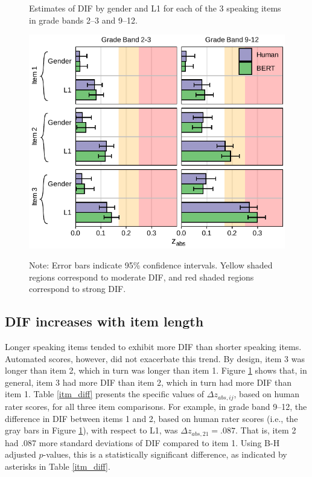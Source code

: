 \documentclass [PhD] {uclathes}
\begin{document}
\begin{figure}[h]
    \centering
    \caption{Estimates of DIF by gender and L1 for each of the 3 speaking items in grade bands 2–3 and 9–12.}    
    \includegraphics[width=5in]{figures/20230504_ETS-DIF_BERT_zabs_itm_edit.pdf}
    \label{fig:zabs_itm}
\caption*{\small Note: Error bars indicate 95\% confidence intervals. Yellow shaded regions correspond to moderate DIF, and red shaded regions correspond to strong DIF.}
\end{figure}

\subsection{DIF increases with item length}

Longer speaking items tended to exhibit more DIF than shorter speaking items. Automated scores, however, did not exacerbate this trend. By design, item 3 was longer than item 2, which in turn was longer than item 1. Figure \ref{fig:zabs_itm} shows that, in general, item 3 had more DIF than item 2, which in turn had more DIF than item 1. Table \ref{itm_diff} presents the specific values of $\Delta z_{abs,ij}$, based on human rater scores, for all three item comparisons. For example, in grade band 9–12, the difference in DIF between items 1 and 2, based on human rater scores (i.e., the gray bars in Figure \ref{fig:zabs_itm}), with respect to L1, was $\Delta z_{abs, 21} = .087$. That is, item 2 had .087 more standard deviations of DIF compared to item 1. Using B-H adjusted $p$-values, this is a statistically significant difference, as indicated by asterisks in Table \ref{itm_diff}. 
\end{document}
